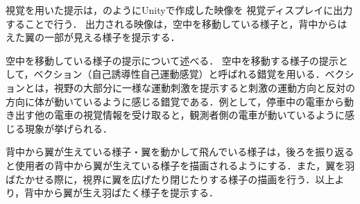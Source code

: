         視覚を用いた提示は，のようにUnityで作成した映像を
        視覚ディスプレイに出力することで行う．
        出力される映像は，空中を移動している様子と，背中からはえた翼の一部が見える様子を提示する．

        空中を移動している様子の提示について述べる．
        空中を移動する様子の提示として，ベクション（自己誘導性自己運動感覚）と呼ばれる錯覚を用いる．ベクションとは，視野の大部分に一様な運動刺激を提示すると刺激の運動方向と反対の方向に体が動いているように感じる錯覚である\cite{bhalla1999visual}\cite{妹尾武治2014ベクションとその周辺の近年の動向}．例として，停車中の電車から動き出す他の電車の視覚情報を受け取ると，観測者側の電車が動いているように感じる現象が挙げられる．

        背中から翼が生えている様子・翼を動かして飛んでいる様子は，後ろを振り返ると使用者の背中から翼が生えている様子を描画されるようにする．また，翼を羽ばたかせる際に，視界に翼を広げたり閉じたりする様子の描画を行う．以上より，背中から翼が生え羽ばたく様子を提示する．



